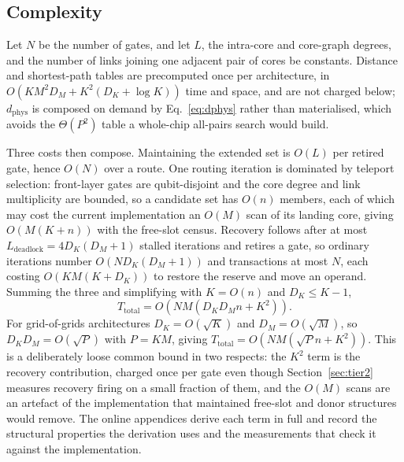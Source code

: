 \documentclass[journal]{IEEEtran}
\newcommand{\dphys}{d_{\mathrm{phys}}}
\begin{document}
\subsection{Complexity}
\label{sec:complexity}

Let $N$ be the number of gates, and let $L$, the intra-core and core-graph degrees, and the number of links joining one adjacent pair of cores be constants. Distance and shortest-path tables are precomputed once per architecture, in $O(KM^2D_M+K^2(D_K+\log K))$ time and space, and are not charged below; $\dphys$ is composed on demand by Eq.~\eqref{eq:dphys} rather than materialised, which avoids the $\Theta(P^2)$ table a whole-chip all-pairs search would build.

Three costs then compose. Maintaining the extended set is $O(L)$ per retired gate, hence $O(N)$ over a route. One routing iteration is dominated by teleport selection: front-layer gates are qubit-disjoint and the core degree and link multiplicity are bounded, so a candidate set has $O(n)$ members, each of which may cost the current implementation an $O(M)$ scan of its landing core, giving $O(M(K+n))$ with the free-slot census. Recovery follows after at most $L_{\mathrm{deadlock}}=4D_K(D_M+1)$ stalled iterations and retires a gate, so ordinary iterations number $O(ND_K(D_M+1))$ and transactions at most $N$, each costing $O(KM(K+D_K))$ to restore the reserve and move an operand. Summing the three and simplifying with $K=O(n)$ and $D_K\le K-1$,
\begin{equation}
T_{\mathrm{total}} = O\!\left( NM\left(D_KD_Mn+K^2\right) \right).
\label{eq:complexity}
\end{equation}
For grid-of-grids architectures $D_K=O(\sqrt{K})$ and $D_M=O(\sqrt{M})$, so $D_KD_M=O(\sqrt{P})$ with $P=KM$, giving $T_{\mathrm{total}}=O(NM(\sqrt{P}n+K^2))$. This is a deliberately loose common bound in two respects: the $K^2$ term is the recovery contribution, charged once per gate even though Section~\ref{sec:tier2} measures recovery firing on a small fraction of them, and the $O(M)$ scans are an artefact of the implementation that maintained free-slot and donor structures would remove. The online appendices derive each term in full and record the structural properties the derivation uses and the measurements that check it against the implementation.


\end{document}
